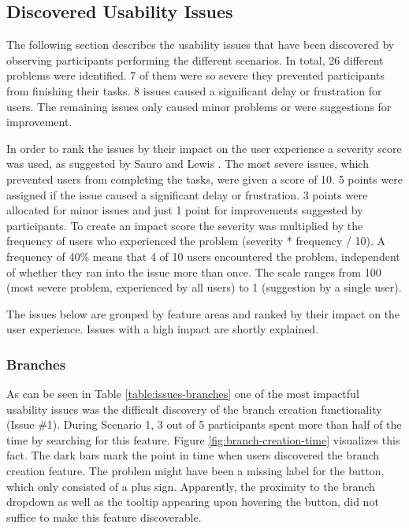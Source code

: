 \subsection{Discovered Usability Issues} \label{sec:usability-issues-1st-study}
The following section describes the usability issues that have been discovered by observing participants performing the different scenarios. In total, 26 different problems were identified. 7 of them were so severe they prevented participants from finishing their tasks. 8 issues caused a significant delay or frustration for users. The remaining issues only caused minor problems or were suggestions for improvement.

In order to rank the issues by their impact on the user experience a severity score was used, as suggested by Sauro and Lewis \cite{sauro_quantifying_2012}. The most severe issues, which prevented users from completing the tasks, were given a score of 10. 5 points were assigned if the issue caused a significant delay or frustration. 3 points were allocated for minor issues and just 1 point for improvements suggested by participants. To create an impact score the severity was multiplied by the frequency of users who experienced the problem (severity * frequency / 10). A frequency of 40\% means that 4 of 10 users encountered the problem, independent of whether they ran into the issue more than once. The scale ranges from 100 (most severe problem, experienced by all users) to 1 (suggestion by a single user).

The issues below are grouped by feature areas and ranked by their impact on the user experience. Issues with a high impact are shortly explained.


\subsubsection{Branches}
As can be seen in Table \ref{table:issues-branches} one of the most impactful usability issues was the difficult discovery of the branch creation functionality (Issue \#1). During Scenario 1, 3 out of 5 participants spent more than half of the time by searching for this feature. Figure \ref{fig:branch-creation-time} visualizes this fact. The dark bars mark the point in time when users discovered the branch creation feature. The problem might have been a missing label for the button, which only consisted of a plus sign. Apparently, the proximity to the branch dropdown as well as the tooltip appearing upon hovering the button, did not suffice to make this feature discoverable.

